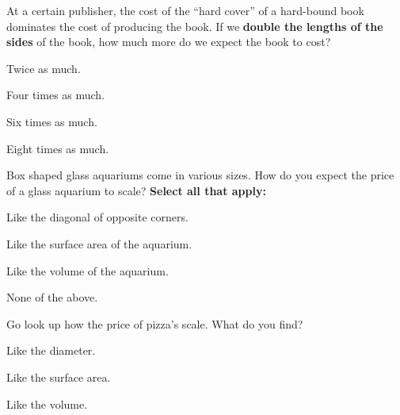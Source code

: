 \documentclass[noauthor,nooutcomes]{ximera}
\author{Bart Snapp}
\begin{document}
\maketitle







\begin{exercise}
 At a certain publisher, the cost of the ``hard cover'' of a
 hard-bound book dominates the cost of producing the book. If we
 \textbf{double the lengths of the sides} of the book, how much more do we expect the
 book to cost?
 \begin{enumerate}
   \begin{multicols}{2}
   \item Twice as much.
   \item Four times as much.
   \item Six times as much.
   \item Eight times as much.
   \end{multicols}
 \end{enumerate}
\end{exercise}


\begin{exercise}
  Box shaped glass aquariums come in various sizes. How do you expect
  the price of a glass aquarium to scale?  \textbf{Select all that
    apply:}
 \begin{enumerate}
   \begin{multicols}{2}
   \item Like the diagonal of opposite corners.
   \item Like the surface area of the aquarium.
   \item Like the volume of the aquarium.
   \item None of the above.
   \end{multicols}
 \end{enumerate}
\end{exercise}



\begin{exercise}
  Go look up how the price of pizza's scale. What do you find?
 \begin{enumerate}
   \begin{multicols}{3}
   \item Like the diameter.
   \item Like the surface area.
   \item Like the volume.
   \end{multicols}
 \end{enumerate}
\end{exercise}
\end{document}
